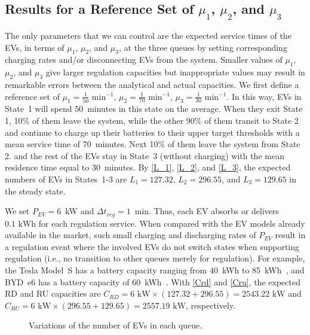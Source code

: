 \documentclass[journal]{IEEEtran}
\begin{document}
\subsection{Results for a Reference Set of $\mu_1$, $\mu_2$, and $\mu_3$} \label{subsec:mu123}
The only parameters that we can control are the expected service times of the EVs, in terms of $\mu_1$, $\mu_2$, and $\mu_3$, at the three queues by setting corresponding charging rates and/or disconnecting EVs from the system. Smaller values of $\mu_1$, $\mu_2$, and $\mu_3$ give larger regulation capacities but inappropriate values may result in remarkable errors between the analytical and actual capacities. We first define a reference set of $\mu_1 = \frac{1}{50} \text{ min}^{-1}$, $\mu_2 = \frac{1}{70} \text{ min}^{-1}$, $\mu_3 = \frac{1}{30} \text{ min}^{-1}$. In this way, EVs in State~1 will spend 50~minutes in this state
on the average. When they exit State 1, 10\% of them leave the system, while the
 other 90\% of them transit to State 2 and continue to  charge up their
batteries to their upper target thresholds  with a mean service
time of 70~minutes.  Next 10\% of them leave the system from State 2. 
and the rest of the EVs stay in State~3 (without
charging) with the mean residence time equal to 30~minutes. 
By \eqref{L_1}, \eqref{L_2}, and \eqref{L_3}, the expected numbers of EVs in
States~1-3 are $L_1 = 127.32$, $L_2 = 296.55$, and $L_3 = 129.65$ in the steady
state.

We set $P_{EV} = 6$~kW and $\Delta t_{reg} = 1$~min.  Thus, each EV absorbs
or delivers $0.1\text{ kWh}$ for each regulation service.  When compared with
the EV models already available in the market, such small charging and
discharging rates of $P_{EV}$ result in a regulation event where the involved
EVs do not switch states when supporting regulation (i.e., no transition to
other queues merely for regulation).  For example, the Tesla Model~S has a
battery capacity ranging from 40~kWh to 85~kWh~\cite{tesla}, and BYD~e6 has a
battery capacity of 60~kWh~\cite{byd}.  With \eqref{Crd} and \eqref{Cru}, the
expected RD and RU capacities are $C_{RD} = 6\text{ kW} \times (127.32 + 296.55) = 2543.22\text{ kW}$ and $C_{RU} = 6\text{ kW} \times (296.55 + 129.65) = 2557.19\text{ kW}$, respectively.

\begin{figure}[!t]
	\begin{center}
	\end{center}
	\caption{Variations of the number of EVs in each queue.}
  \label{fig:t_sim}
\end{figure}
\end{document}
